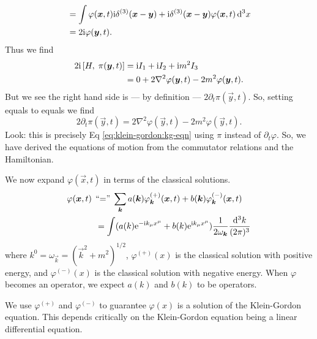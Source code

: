 \begin{soln}
\begin{subequations}
\begin{align}
&=\int\varphi(\vec{x},t)\I\delta^{(3)}(\vec{x}-\vec{y})+\I\delta^{(3)}(\vec{x}-\vec{y})\varphi(\vec{x},t)\,\D^{3}x\\
&=2\I\varphi(\vec{y},t).
\end{align}
\end{subequations}
Thus we find
\begin{equation}
\begin{split}
2\I\commutator{H}{\pi(\vec{y},t)}&=\I I_{1}+\I I_{2} + \I m^{2} I_{3}\\
&=0 + 2\nabla^{2}\varphi(\vec{y},t) - 2m^{2}\varphi(\vec{y},t).
\end{split}
\end{equation}
But we see the right hand side is --- by definition ---
$2\partial_{t}\pi(\vec{y}, t)$. So, setting equals to equals we find
\begin{equation}
2\partial_{t}\pi(\vec{y}, t)=2\nabla^{2}\varphi(\vec{y},t) - 2m^{2}\varphi(\vec{y},t).
\end{equation}
Look: this is precisely Eq \eqref{eq:klein-gordon:kg-eqn} using $\pi$
instead of $\partial_{t}\varphi$. So, we have derived the equations of
motion from the commutator relations and the Hamiltonian.
\end{soln}

\label{par:scalar:plane-wave-expansions}
We now expand $\varphi(\vec{x},t)$ in terms of the classical solutions.
\begin{equation}\label{eq:scalar:plane-wave-expansion-eqn}
\begin{split}
\varphi(\vec{x},t)
\;\,&\mbox{``$=$''}\;\sum_{\vec{k}}a(\vec{k})\varphi_{\vec{k}}^{(+)}(\vec{x},t)
                          + b(\vec{k})\varphi_{\vec{k}}^{(-)}(\vec{x},t)\\
&=\int(a(k)\E^{-\I k_{\mu}x^{\mu}}+b(k)\E^{\I k_{\mu}x^{\mu}})\frac{1}{2\omega_{\vec{k}}}\frac{\D^{3}k}{(2\pi)^{3}}
\end{split}
\end{equation}
where $k^{0}=\omega_{\vec{k}}=(\vec{k}^{2}+m^{2})^{1/2}$,
$\varphi^{(+)}(x)$ is the classical solution with positive energy, and
$\varphi^{(-)}(x)$ is the classical solution with negative energy. When
$\varphi$ becomes an operator, we expect $a(k)$ and $b(k)$ to be
operators.

We use $\varphi^{(+)}$ and $\varphi^{(-)}$ to guarantee $\varphi(x)$ is
a solution of the Klein-Gordon equation. This depends critically on the
Klein-Gordon equation being a linear differential equation.

